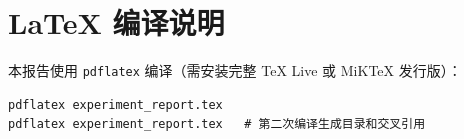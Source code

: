 \documentclass[UTF8,a4paper,12pt]{ctexart}
\numberwithin{figure}{section}
\numberwithin{table}{section}
\begin{document}
\section{LaTeX 编译说明}

本报告使用 \texttt{pdflatex} 编译（需安装完整 TeX Live 或 MiKTeX 发行版）：

\begin{verbatim}
pdflatex experiment_report.tex
pdflatex experiment_report.tex   # 第二次编译生成目录和交叉引用
\end{verbatim}
\end{document}

